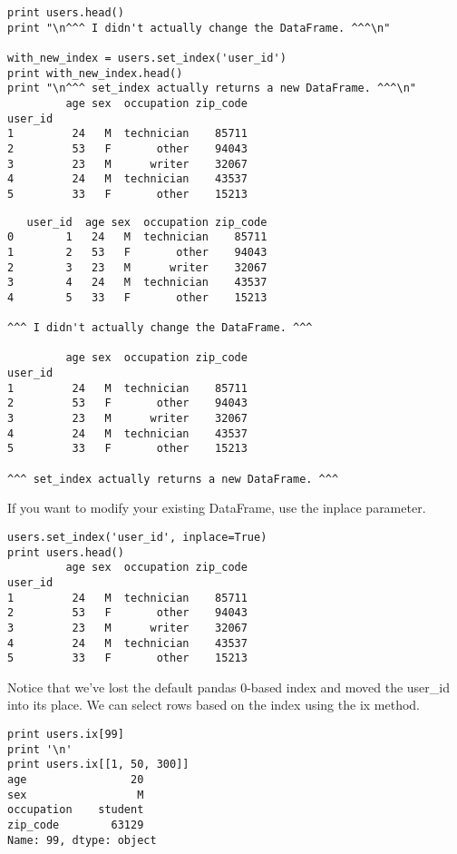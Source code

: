 \begin{framed}
\begin{framed}
\begin{framed}
\begin{framed}
\begin{framed}
\begin{framed}
\begin{framed}
\begin{framed}
\begin{verbatim}
print users.head()
print "\n^^^ I didn't actually change the DataFrame. ^^^\n"

with_new_index = users.set_index('user_id')
print with_new_index.head()
print "\n^^^ set_index actually returns a new DataFrame. ^^^\n"
         age sex  occupation zip_code
user_id                              
1         24   M  technician    85711
2         53   F       other    94043
3         23   M      writer    32067
4         24   M  technician    43537
5         33   F       other    15213

\end{verbatim}

\begin{framed}
	\begin{verbatim}
   user_id  age sex  occupation zip_code
0        1   24   M  technician    85711
1        2   53   F       other    94043
2        3   23   M      writer    32067
3        4   24   M  technician    43537
4        5   33   F       other    15213

^^^ I didn't actually change the DataFrame. ^^^

         age sex  occupation zip_code
user_id                              
1         24   M  technician    85711
2         53   F       other    94043
3         23   M      writer    32067
4         24   M  technician    43537
5         33   F       other    15213

^^^ set_index actually returns a new DataFrame. ^^^

\end{verbatim}

If you want to modify your existing DataFrame, use the inplace parameter.


\begin{framed}
\begin{verbatim}
users.set_index('user_id', inplace=True)
print users.head()
         age sex  occupation zip_code
user_id                              
1         24   M  technician    85711
2         53   F       other    94043
3         23   M      writer    32067
4         24   M  technician    43537
5         33   F       other    15213
\end{verbatim}


Notice that we've lost the default pandas 0-based index and moved the user\_id into its place. We can select rows based on the index using the ix method.


\begin{framed}
\begin{verbatim}
print users.ix[99]
print '\n'
print users.ix[[1, 50, 300]]
age                20
sex                 M
occupation    student
zip_code        63129
Name: 99, dtype: object



\end{verbatim}
\end{framed}
\end{framed}
\end{framed}
\end{framed}
\end{framed}
\end{framed}
\end{framed}
\end{framed}
\end{framed}
\end{framed}
\end{framed}
